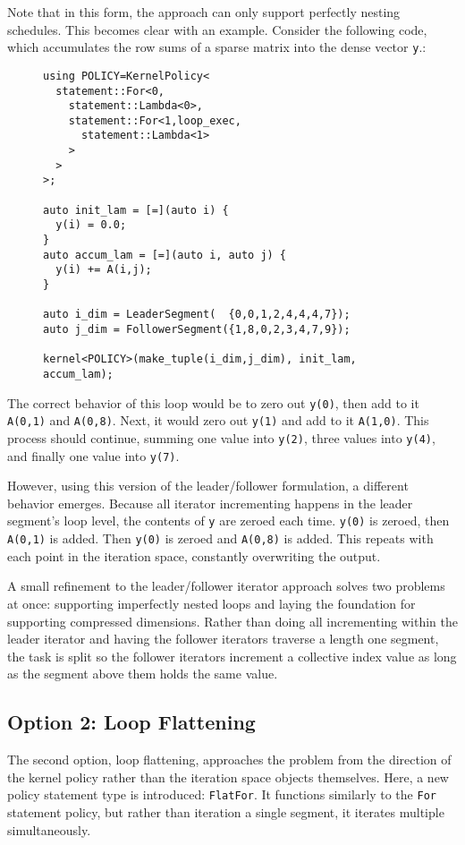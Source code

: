 Note that in this form, the approach can only support perfectly nesting schedules.
This becomes clear with an example.
Consider the following code, which accumulates the row sums of a sparse matrix into the dense vector \verb.y..:
\begin{figure}
\begin{lstlisting}
using POLICY=KernelPolicy<
  statement::For<0,
    statement::Lambda<0>,
    statement::For<1,loop_exec,
      statement::Lambda<1>
    >
  >
>;

auto init_lam = [=](auto i) {
  y(i) = 0.0;
}
auto accum_lam = [=](auto i, auto j) {
  y(i) += A(i,j);
}

auto i_dim = LeaderSegment(  {0,0,1,2,4,4,4,7});
auto j_dim = FollowerSegment({1,8,0,2,3,4,7,9});

kernel<POLICY>(make_tuple(i_dim,j_dim), init_lam, accum_lam);
\end{lstlisting}
\end{figure}
The correct behavior of this loop would be to zero out \verb.y(0)., then add to it \verb.A(0,1). and \verb.A(0,8)..
Next, it would zero out \verb.y(1). and add to it \verb.A(1,0)..
This process should continue, summing one value into \verb.y(2)., three values into \verb.y(4)., and finally one value into \verb.y(7)..

However, using this version of the leader/follower formulation, a different behavior emerges.
Because all iterator incrementing happens in the leader segment's loop level, the contents of \verb.y. are zeroed each time.
\verb.y(0). is zeroed, then \verb.A(0,1). is added.
Then \verb.y(0). is zeroed and \verb.A(0,8). is added.
This repeats with each point in the iteration space, constantly overwriting the output.

A small refinement to the leader/follower iterator approach solves two problems at once: supporting imperfectly nested loops and laying the foundation for supporting compressed dimensions.
Rather than doing all incrementing within the leader iterator and having the follower iterators traverse a length one segment, the task is split so the follower iterators increment a collective index value as long as the segment above them holds the same value.

\subsection{Option 2: Loop Flattening}

The second option, loop flattening, approaches the problem from the direction of the kernel policy rather than the iteration space objects themselves.
Here, a new policy statement type is introduced: \verb.FlatFor.. 
It functions similarly to the \verb.For. statement policy, but rather than iteration a single segment, it iterates multiple simultaneously. 

